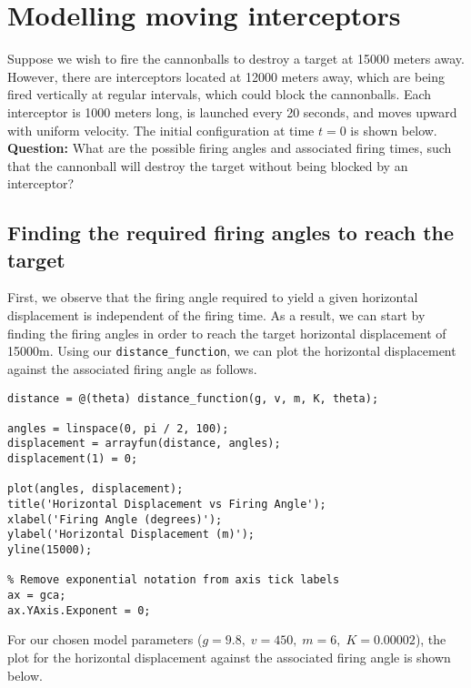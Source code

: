 \newpage
\section{Modelling moving interceptors}

Suppose we wish to fire the cannonballs to destroy a target at 15000 meters away. However, there are interceptors located at 12000 meters away, which are being fired vertically at regular intervals, which could block the cannonballs. Each interceptor is 1000 meters long, is launched every 20 seconds, and moves upward with uniform velocity. The initial configuration at time $t = 0$ is shown below.\\

\noindent
\textbf{Question:} What are the possible firing angles and associated firing times, such that the cannonball will destroy the target without being blocked by an interceptor?



\subsection{Finding the required firing angles to reach the target}
First, we observe that the firing angle required to yield a given horizontal displacement is independent of the firing time. As a result, we can start by finding the firing angles in order to reach the target horizontal displacement of 15000m. Using our \lstinline|distance_function|, we can plot the horizontal displacement against the associated firing angle as follows.

\begin{lstlisting}
distance = @(theta) distance_function(g, v, m, K, theta);

angles = linspace(0, pi / 2, 100);
displacement = arrayfun(distance, angles);
displacement(1) = 0;

plot(angles, displacement);
title('Horizontal Displacement vs Firing Angle');
xlabel('Firing Angle (degrees)');
ylabel('Horizontal Displacement (m)');
yline(15000);

% Remove exponential notation from axis tick labels
ax = gca;
ax.YAxis.Exponent = 0;
\end{lstlisting}

\noindent
For our chosen model parameters ($g = 9.8, \; v = 450, \; m = 6, \; K = 0.00002$), the plot for the horizontal displacement against the associated firing angle is shown below.

